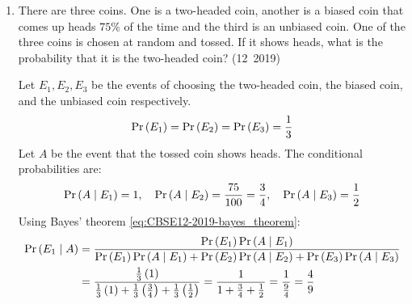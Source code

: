 \begin{enumerate}[label=\thesubsection.\arabic*, ref=\thesubsection.\theenumi]
\solution
Let $x$ and $y$ be the units of type A and type B goods produced.
From \eqref{eq:CBSE12-2019-lpp_obj} and \eqref{eq:CBSE12-2019-lpp_constraints}, the LPP formulation is:
\begin{align}
	\text{Maximize } & Z = 40x + 50y \\
	\text{subject to } & 3x + y \le 9 \\
	& x + 2y \le 8 \\
	& x \ge 0, \; y \ge 0
\end{align}
The feasible region is the polygon $OABC$ bounded by the extreme corner points:
\begin{align}
	O(0, 0), \quad A(3, 0), \quad B(2, 3), \quad C(0, 4)
\end{align}
Evaluating the objective function $Z$ at each corner point:
\begin{itemize}
	\item At $O(0, 0): Z = 0$
	\item At $A(3, 0): Z = 40\brak{3} + 50\brak{0} = 120$
	\item At $B(2, 3): Z = 40\brak{2} + 50\brak{3} = 80 + 150 = 230$
	\item At $C(0, 4): Z = 40\brak{0} + 50\brak{4} = 200$
\end{itemize}
By the Corner-Point Theorem, the maximum profit is Rs.~$230$, achieved by producing $2$ units of type A and $3$ units of type B.
The following code verifies the graphical optimization:
\begin{lstlisting}[frame=single, basicstyle=\ttfamily\small]
	codes/q36.py
\end{lstlisting}

\item There are three coins. One is a two-headed coin, another is a biased coin that comes up heads $75\%$ of the time and the third is an unbiased coin. One of the three coins is chosen at random and tossed. If it shows heads, what is the probability that it is the two-headed coin?
\hfill (12~2019)

\solution
Let $E_1, E_2, E_3$ be the events of choosing the two-headed coin, the biased coin, and the unbiased coin respectively.
\begin{align}
	\Pr\left(E_1\right) = \Pr\left(E_2\right) = \Pr\left(E_3\right) = \frac{1}{3}
\end{align}
Let $A$ be the event that the tossed coin shows heads. The conditional probabilities are:
\begin{align}
	\Pr\left(A \mid E_1\right) = 1, \quad \Pr\left(A \mid E_2\right) = \frac{75}{100} = \frac{3}{4}, \quad \Pr\left(A \mid E_3\right) = \frac{1}{2}
\end{align}
Using Bayes' theorem \eqref{eq:CBSE12-2019-bayes_theorem}:
\begin{align}
	\Pr\left(E_1 \mid A\right) &= \frac{\Pr\left(E_1\right)\Pr\left(A \mid E_1\right)}{\Pr\left(E_1\right)\Pr\left(A \mid E_1\right) + \Pr\left(E_2\right)\Pr\left(A \mid E_2\right) + \Pr\left(E_3\right)\Pr\left(A \mid E_3\right)} \\
	&= \frac{\frac{1}{3}\left(1\right)}{\frac{1}{3}\left(1\right) + \frac{1}{3}\left(\frac{3}{4}\right) + \frac{1}{3}\left(\frac{1}{2}\right)} = \frac{1}{1 + \frac{3}{4} + \frac{1}{2}} = \frac{1}{\frac{9}{4}} = \frac{4}{9}
\end{align}



\end{enumerate}
